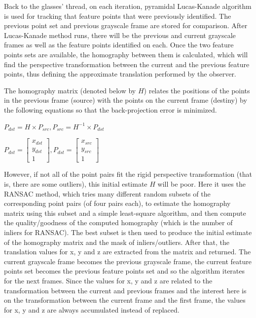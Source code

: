 \documentclass[msc, a4paper, classic, en]{ufbathesis}
\begin{document}
Back to the glasses' thread, on each iteration, pyramidal Lucas-Kanade algorithm is used for tracking that feature points that were previously identified. The previous point set and previous grayscale frame are stored for comparison. After Lucas-Kanade method runs, there will be the previous and current grayscale frames as well as the feature points identified on each. Once the two feature points sets are available, the homography between them is calculated, which will find the perspective transformation between the current and the previous feature points, thus defining the approximate translation performed by the observer.

The homography matrix (denoted below by $H$) relates the positions of the points in the previous frame (source) with the points on the current frame (destiny) by the following equations \cite{bradski2008learning} so that the back-projection error is minimized.

\begin{center}
$P_{dst} = H \times P_{src}, P_{src} = H^{-1} \times P_{dst}$
\end{center}

\begin{center}
$P_{dst} = \begin{bmatrix} x_{dst} \\ y_{dst} \\ 1 \end{bmatrix}, P_{dst} = \begin{bmatrix} x_{src} \\ y_{src} \\ 1 \end{bmatrix}$
\end{center}

However, if not all of the point pairs fit the rigid perspective transformation (that is, there are some outliers), this initial estimate $H$ will be poor. Here it uses the RANSAC method, which tries many different random subsets of the corresponding point pairs (of four pairs each), to estimate the homography matrix using this subset and a simple least-square algorithm, and then compute the quality/goodness of the computed homography (which is the number of inliers for RANSAC). The best subset is then used to produce the initial estimate of the homography matrix and the mask of inliers/outliers. After that, the translation values for x, y and z are extracted from the matrix and returned. The current grayscale frame becomes the previous grayscale frame, the current feature points set becomes the previous feature points set and so the algorithm iterates for the next frames. Since the values for x, y and z are related to the transformation between the current and previous frames and the interest here is on the transformation between the current frame and the first frame, the values for x, y and z are always accumulated instead of replaced.
\end{document}
